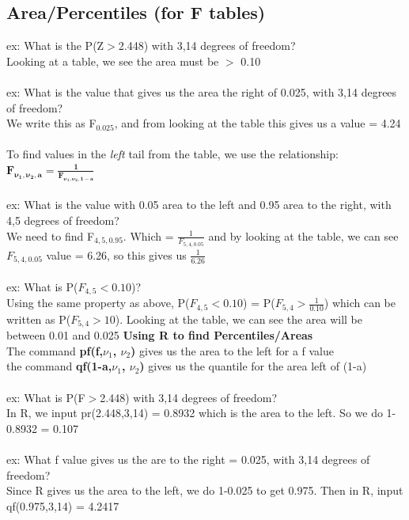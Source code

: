 \documentclass[12pt, a4paper]{article}
\begin{document}
	\subsection{Area/Percentiles (for F tables)}
	ex: What is the P(Z$>$2.448) with 3,14 degrees of freedom? \\
	Looking at a table, we see the area must be $>$ 0.10 \\~\\
	ex: What is the value that gives us the area the right of 0.025, with 3,14 degrees of freedom? \\
	We write this as F$_{0.025}$, and from looking at the table this gives us a value = 4.24 \\~\\
	To find values in the \textit{left} tail from the table, we use the relationship: \\
	\large $\mathbf{F_{\nu_1,\nu_2,a} = \frac{1}{F_{\nu_1,\nu_2,1-a}}}$ \normalsize \\~\\
	ex: What is the value with 0.05 area to the left and 0.95 area to the right, with 4,5 degrees of freedom? \\
	We need to find F$_{4,5,0.95}$. Which = $\frac{1}{F_{5,4,0.05}}$ and by looking at the table, we can see $F_{5,4,0.05}$ value = 6.26, so this gives us $\frac{1}{6.26}$ \\~\\
	ex: What is P($F_{4,5}<0.10$)? \\
	Using the same property as above, P($F_{4,5}<0.10$) = P($F_{5,4}>\frac{1}{0.10}$) which can be written as P($F_{5,4}>10$). Looking at the table, we can see the area will be between 0.01 and 0.025 \newpage
	\noindent \textbf{Using R to find Percentiles/Areas} \\
	The command \textbf{pf(f,$\nu_1$, $\nu_2$)} gives us the area to the left for a f value \\
	the command \textbf{qf(1-a,$\nu_1$, $\nu_2$)} gives us the quantile for the area left of (1-a) \\~\\	
	ex: What is P(F$>$2.448) with 3,14 degrees of freedom? \\
	In R, we input pr(2.448,3,14) = 0.8932 which is the area to the left. So we do 1-0.8932 = 0.107 \\~\\
	ex: What f value gives us the are to the right = 0.025, with 3,14 degrees of freedom? \\
	Since R gives us the area to the left, we do 1-0.025 to get 0.975. Then in R, input qf(0.975,3,14) = 4.2417 \\~\\
	
\end{document}
